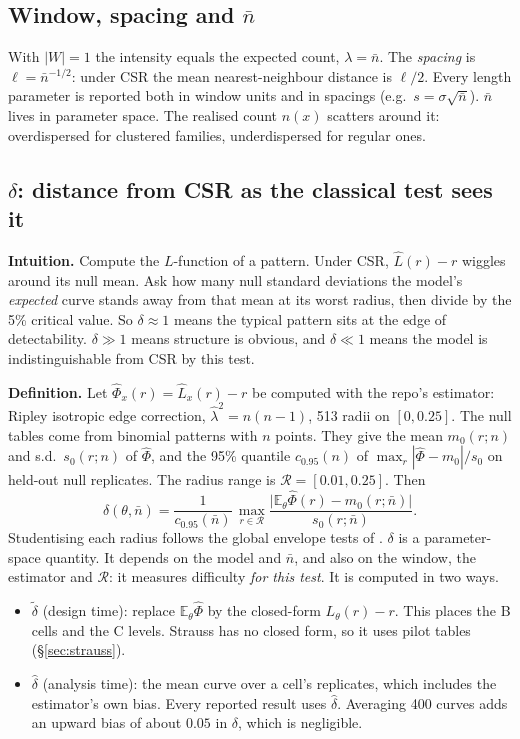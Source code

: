 \documentclass[10pt,a4paper]{article}
\newcommand{\nbar}{\bar n}
\newcommand{\dtil}{\tilde\delta}
\newcommand{\dhat}{\hat\delta}
\newcommand{\E}{\mathbb{E}}
\newcommand{\R}{\mathcal{R}}
\begin{document}
\subsection{Window, spacing and $\nbar$}
With $|W|=1$ the intensity equals the expected count, $\lambda=\nbar$. The \emph{spacing} is $\ell=\nbar^{-1/2}$: under CSR the mean nearest-neighbour distance is $\ell/2$. Every length parameter is reported both in window units and in spacings (e.g.\ $s=\sigma\sqrt{\nbar}$). $\nbar$ lives in parameter space. The realised count $n(x)$ scatters around it: overdispersed for clustered families, underdispersed for regular ones.

\subsection{$\delta$: distance from CSR as the classical test sees it}\label{sec:delta}
\textbf{Intuition.} Compute the $L$-function of a pattern. Under CSR, $\hat L(r)-r$ wiggles around its null mean. Ask how many null standard deviations the model's \emph{expected} curve stands away from that mean at its worst radius, then divide by the 5\% critical value. So $\delta\approx1$ means the typical pattern sits at the edge of detectability. $\delta\gg1$ means structure is obvious, and $\delta\ll1$ means the model is indistinguishable from CSR by this test.

\textbf{Definition.} Let $\hat\Phi_x(r)=\hat L_x(r)-r$ be computed with the repo's estimator: Ripley isotropic edge correction, $\hat\lambda^2=n(n-1)$, 513 radii on $[0,0.25]$. The null tables come from binomial patterns with $n$ points. They give the mean $m_0(r;n)$ and s.d.\ $s_0(r;n)$ of $\hat\Phi$, and the 95\% quantile $c_{0.95}(n)$ of $\max_r|\hat\Phi-m_0|/s_0$ on held-out null replicates. The radius range is $\R=[0.01,0.25]$. Then
\begin{equation}
\delta(\theta,\nbar)=\frac{1}{c_{0.95}(\nbar)}\,\max_{r\in\R}\frac{\big|\E_\theta\hat\Phi(r)-m_0(r;\nbar)\big|}{s_0(r;\nbar)}.
\label{eq:delta}
\end{equation}
Studentising each radius follows the global envelope tests of \citet{Myllymaki2017}. $\delta$ is a parameter-space quantity. It depends on the model and $\nbar$, and also on the window, the estimator and $\R$: it measures difficulty \emph{for this test}. It is computed in two ways.
\begin{itemize}
  \item $\dtil$ (design time): replace $\E_\theta\hat\Phi$ by the closed-form $L_\theta(r)-r$. This places the B cells and the C levels. Strauss has no closed form, so it uses pilot tables (\S\ref{sec:strauss}).
  \item $\dhat$ (analysis time): the mean curve over a cell's replicates, which includes the estimator's own bias. Every reported result uses $\dhat$. Averaging 400 curves adds an upward bias of about $0.05$ in $\delta$, which is negligible.
\end{itemize}
\end{document}
